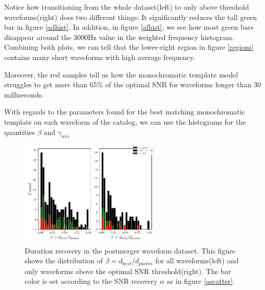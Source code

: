 Notice how transitioning from the whole dataset(left) to only above threshold waveforms(right) does two different things: It significantly reduces the tall green bar in figure \ref{adhist}. In addition, in figure \ref{afhist}, we see how most green bars disappear around the 3000Hz value in the weighted frequency histogram. Combining both plots, we can tell that the lower-right region in figure \ref{regions} contains many short waveforms with high average frequency.

Moreover, the red samples tell us how the monochromatic template model struggles to get more than 65\% of the optimal SNR for waveforms longer than 30 milliseconds. 


\newpage 

With regards to the parameters found for the best matching monochromatic template on each waveform of the catalog, we can use the histograms for the quantities  $\beta$ and $\gamma_{wei}$ 

\begin{figure}[hbt!]
\begin{center}
\includegraphics[width=0.6\textwidth, angle=0]{images/Data_analysis/results/alpha_betahist.pdf}
\captionsetup{width=0.8\textwidth}
\caption[Duration recovery in the postmerger waveform dataset]{Duration recovery in the postmerger waveform dataset. This figure shows the distribution of $\beta=d_{best}/d_{postm}$ for all waveforms(left) and only waveforms above the optimal SNR threshold(right). The bar color is set according to the SNR recovery $\alpha$ as in figure \ref{ascatter}.}
\label{abhist}
\end{center}
\end{figure}

